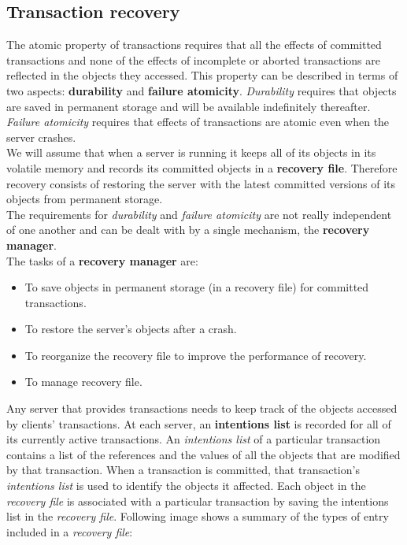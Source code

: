 \subsection{Transaction recovery}
The atomic property of transactions requires that all the effects of committed transactions and none of the effects of incomplete or aborted transactions are reflected in the objects they accessed. This property can be described in terms of two aspects: \textbf{durability} and \textbf{failure atomicity}. \textit{Durability} requires that objects are saved in permanent storage and will be available indefinitely thereafter. \textit{Failure atomicity} requires that effects of transactions are atomic even when the server crashes.\\
We will assume that when a server is running it keeps all of its objects in its volatile memory and records its committed objects in a \textbf{recovery file}. Therefore recovery consists of restoring the server with the latest committed versions of its objects from permanent storage.\\
The requirements for \textit{durability} and \textit{failure atomicity} are not really independent of one another and can be dealt with by a single mechanism, the \textbf{recovery manager}. \\
The tasks of a \textbf{recovery manager} are:
\begin{itemize}
	\item To save objects in permanent storage (in a recovery file) for committed
	transactions.
	\item To restore the server’s objects after a crash.
	\item To reorganize the recovery file to improve the performance of recovery.
	\item To manage recovery file.
\end{itemize}
Any server that provides transactions needs to keep track of the objects accessed by clients’ transactions. At each server, an \textbf{intentions list} is recorded for all of its currently active transactions. An \textit{intentions list} of a particular transaction contains a list of the references and the values of all the objects that are modified by that transaction. When a transaction is committed, that transaction’s \textit{intentions list} is used to identify the objects it affected. Each object in the \textit{recovery file} is associated with a particular transaction by saving the intentions list in the
\textit{recovery file}. Following image shows a summary of the types of entry included in a \textit{recovery file}:
